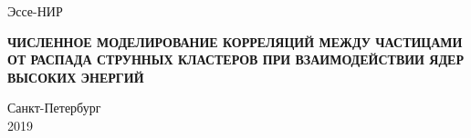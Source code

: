 \documentclass[runningheads,a4paper]{article}
\begin{document}

\begin{center}
\Huge{Эссе-НИР} 
\end{center}





\vspace{5cc}
\begin{center}
\Large{{\bf ЧИСЛЕННОЕ МОДЕЛИРОВАНИЕ КОРРЕЛЯЦИЙ МЕЖДУ ЧАСТИЦАМИ ОТ РАСПАДА СТРУННЫХ КЛАСТЕРОВ ПРИ ВЗАИМОДЕЙСТВИИ ЯДЕР ВЫСОКИХ ЭНЕРГИЙ }}
\end{center}
\vspace{22cc}
\begin{center}
\Large{
Санкт-Петербург \\
2019}
\end{center}
\end{document}

